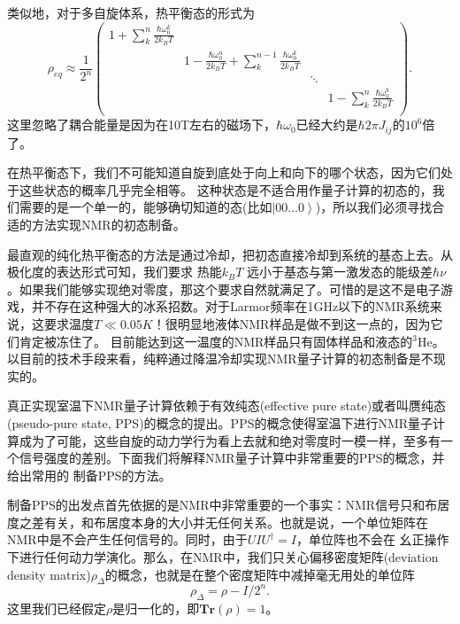 类似地，对于多自旋体系，热平衡态的形式为
\begin{equation}\label{aaa}
\rho_{eq} \approx \frac{1}{2^n}\left(
                                 \begin{array}{cccc}
                                   1+ \sum_k^n \frac{\hbar \omega_0^k}{2k_BT}  &  &  &  \\
                                    & 1- \frac{\hbar \omega_0^n}{2k_BT} + \sum_k^{n-1}\frac{\hbar \omega_0^k}{2k_BT} &  & \\
                                    &  & \ddots & \\
                                    &  &  & 1- \sum_k^n\frac{\hbar \omega_0^k}{2k_BT} \\
                                 \end{array}
                               \right).
\end{equation}
这里忽略了耦合能量是因为在10T左右的磁场下，$\hbar \omega_0$已经大约是$\hbar2\pi J_{ij}$的$10^6$倍了。

在热平衡态下，我们不可能知道自旋到底处于向上和向下的哪个状态，因为它们处于这些状态的概率几乎完全相等。
这种状态是不适合用作量子计算的初态的，我们需要的是一个单一的，能够确切知道的态(比如$\left\vert 00\ldots 0 \right \rangle$)，所以我们必须寻找合适的方法实现NMR的初态制备。

最直观的纯化热平衡态的方法是通过冷却，把初态直接冷却到系统的基态上去。从极化度的表达形式可知，我们要求
热能$k_BT$ 远小于基态与第一激发态的能级差$\hbar \nu$。如果我们能够实现绝对零度，那这个要求自然就满足了。可惜的是这不是电子游戏，并不存在这种强大的冰系招数。对于Larmor频率在1GHz以下的NMR系统来说，这要求温度$T\ll0.05K$！很明显地液体NMR样品是做不到这一点的，因为它们肯定被冻住了。
目前能达到这一温度的NMR样品只有固体样品和液态的$^3$He\cite{pps1}。 以目前的技术手段来看，纯粹通过降温冷却实现NMR量子计算的初态制备是不现实的。

真正实现室温下NMR量子计算依赖于有效纯态(effective pure state)或者叫赝纯态(pseudo-pure state, PPS)的概念的提出。PPS的概念使得室温下进行NMR量子计算成为了可能，这些自旋的动力学行为看上去就和绝对零度时一模一样，至多有一个信号强度的差别。下面我们将解释NMR量子计算中非常重要的PPS的概念，并给出常用的
制备PPS的方法。

制备PPS的出发点首先依据的是NMR中非常重要的一个事实：NMR信号只和布居度之差有关，和布居度本身的大小并无任何关系。也就是说，一个单位矩阵在NMR中是不会产生任何信号的。同时，由于$UIU^{\dagger}=I$，单位阵也不会在
幺正操作下进行任何动力学演化。那么，在NMR中，我们只关心偏移密度矩阵(deviation density matrix)$\rho_{\Delta}$的概念，也就是在整个密度矩阵中减掉毫无用处的单位阵
\begin{equation}\label{aaa}
\rho_{\Delta} = \rho-I/2^n.
\end{equation}
这里我们已经假定$\rho$是归一化的，即$\textbf{Tr}(\rho) = 1$。

